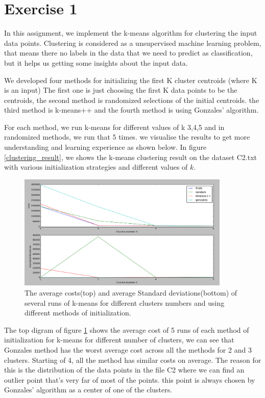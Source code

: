 \section*{Exercise 1}
In this assignment, we implement the k-means algorithm for clustering the input data points.
Clustering is considered as a unsupervised machine learning problem, that means there no labels in the data that we need to predict as classification, but it helps us getting some insights about the input data.

We developed four methods for initializing the first K cluster centroids (where K is an input)
The first one is just choosing the first K data points to be the centroids, the second method is randomized selections of the initial centroids. the third method is k-means++
and the fourth method is using Gonzales’ algorithm.

For each method, we run k-means for different values of k {3,4,5} and in randomized methods, we run that 5 times. we visualise the results to get more understanding and learning experience as shown below. In figure \ref{clustering_result}, we shows the k-means clustering result on the dataset C2.txt with various initialization strategies and different values of $k$.

\begin{figure}[!htb]
\centering
\includegraphics[width=0.9\textwidth]{shots/std_mean.png}
\caption{The average costs(top) and average Standard deviations(bottom) of several runs of k-means for different clusters numbers and using different methods of initialization.}
\label{std_mean}
\end{figure}

The top digram of figure \ref{std_mean} shows the average cost of 5 runs of each method of initialization for k-means for different number of clusters, we can see that Gonzales method has the worst average cost across all the methods for 2 and 3 clusters. Starting of 4, all the method has similar costs on average. The reason for this is the distribution of the data points in the file C2 where we can find an outlier point that's very far of most of the points. this point is always chosen by Gonzales' algorithm as a center of one of the clusters.

